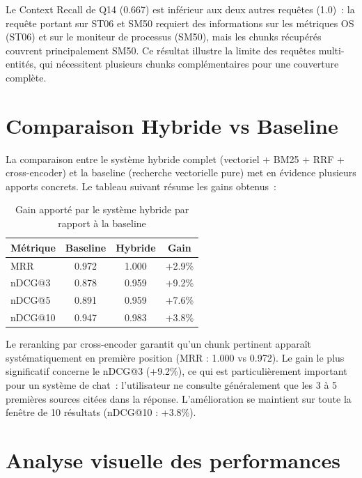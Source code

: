 Le Context Recall de Q14 (0.667) est inférieur aux deux autres requêtes (1.0)~: la requête portant sur ST06 et SM50 requiert des informations sur les métriques OS (ST06) et sur le moniteur de processus (SM50), mais les chunks récupérés couvrent principalement SM50. Ce résultat illustre la limite des requêtes multi-entités, qui nécessitent plusieurs chunks complémentaires pour une couverture complète.

\section{Comparaison Hybride vs Baseline}

La comparaison entre le système hybride complet (vectoriel + BM25 + RRF + cross-encoder) et la baseline (recherche vectorielle pure) met en évidence plusieurs apports concrets. Le tableau suivant résume les gains obtenus~:

\begin{table}[H]
\centering
\caption{Gain apporté par le système hybride par rapport à la baseline}
\label{tab:gain-hybride}
\begin{tabular}{|l|c|c|c|}
\hline
\textbf{Métrique} & \textbf{Baseline} & \textbf{Hybride} & \textbf{Gain} \\
\hline
MRR     & 0.972 & 1.000 & +2.9\% \\
\hline
nDCG@3  & 0.878 & 0.959 & +9.2\% \\
\hline
nDCG@5  & 0.891 & 0.959 & +7.6\% \\
\hline
nDCG@10 & 0.947 & 0.983 & +3.8\% \\
\hline
\end{tabular}
\end{table}

Le reranking par cross-encoder garantit qu'un chunk pertinent apparaît systématiquement en première position (MRR : 1.000 vs 0.972). Le gain le plus significatif concerne le nDCG@3 (+9.2\%), ce qui est particulièrement important pour un système de chat~: l'utilisateur ne consulte généralement que les 3 à 5 premières sources citées dans la réponse. L'amélioration se maintient sur toute la fenêtre de 10 résultats (nDCG@10 : +3.8\%).

\section{Analyse visuelle des performances}
\label{sec:analyse-visuelle}

